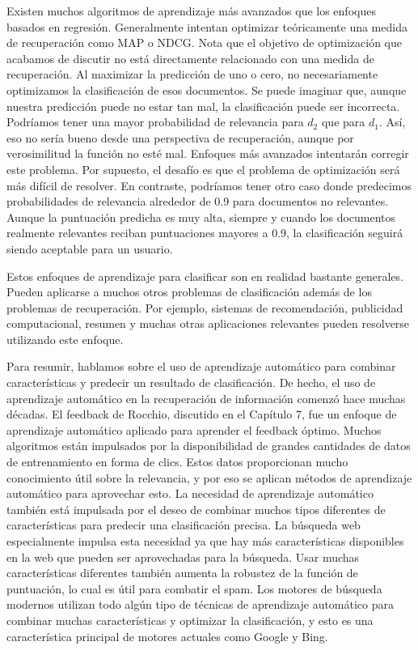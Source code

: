 Existen muchos algoritmos de aprendizaje más avanzados que los enfoques basados en regresión. Generalmente intentan optimizar teóricamente una medida de recuperación como MAP o NDCG. Nota que el objetivo de optimización que acabamos de discutir no está directamente relacionado con una medida de recuperación. Al maximizar la predicción de uno o cero, no necesariamente optimizamos la clasificación de esos documentos. Se puede imaginar que, aunque nuestra predicción puede no estar tan mal, la clasificación puede ser incorrecta. Podríamos tener una mayor probabilidad de relevancia para $d_2$ que para $d_1$. Así, eso no sería bueno desde una perspectiva de recuperación, aunque por verosimilitud la función no esté mal. Enfoques más avanzados intentarán corregir este problema. Por supuesto, el desafío es que el problema de optimización será más difícil de resolver. En contraste, podríamos tener otro caso donde predecimos probabilidades de relevancia alrededor de 0.9 para documentos no relevantes. Aunque la puntuación predicha es muy alta, siempre y cuando los documentos realmente relevantes reciban puntuaciones mayores a 0.9, la clasificación seguirá siendo aceptable para un usuario.

Estos enfoques de aprendizaje para clasificar son en realidad bastante generales. Pueden aplicarse a muchos otros problemas de clasificación además de los problemas de recuperación. Por ejemplo, sistemas de recomendación, publicidad computacional, resumen y muchas otras aplicaciones relevantes pueden resolverse utilizando este enfoque.

Para resumir, hablamos sobre el uso de aprendizaje automático para combinar características y predecir un resultado de clasificación. De hecho, el uso de aprendizaje automático en la recuperación de información comenzó hace muchas décadas. El feedback de Rocchio, discutido en el Capítulo 7, fue un enfoque de aprendizaje automático aplicado para aprender el feedback óptimo. Muchos algoritmos están impulsados por la disponibilidad de grandes cantidades de datos de entrenamiento en forma de clics. Estos datos proporcionan mucho conocimiento útil sobre la relevancia, y por eso se aplican métodos de aprendizaje automático para aprovechar esto. La necesidad de aprendizaje automático también está impulsada por el deseo de combinar muchos tipos diferentes de características para predecir una clasificación precisa. La búsqueda web especialmente impulsa esta necesidad ya que hay más características disponibles en la web que pueden ser aprovechadas para la búsqueda. Usar muchas características diferentes también aumenta la robustez de la función de puntuación, lo cual es útil para combatir el spam. Los motores de búsqueda modernos utilizan todo algún tipo de técnicas de aprendizaje automático para combinar muchas características y optimizar la clasificación, y esto es una característica principal de motores actuales como Google y Bing.

